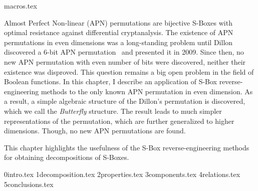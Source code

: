 \myminitoc

{macros.tex}

Almost Perfect Non-linear (APN) permutations are bijective S-Boxes with optimal resistance against differential cryptanalysis. The existence of APN permutations in even dimensions was a long-standing problem until Dillon~\etal{} discovered a 6-bit APN permutation~\cite{DillonAPN,DillonPres} and presented it in 2009. Since then, no new APN permutation with even number of bits were discovered, neither their existence was disproved. This question remains a big open problem in the field of Boolean functions. In this chapter, I describe an application of S-Box reverse-engineering methods to the only known APN permutation in even dimension. As a result, a simple algebraic structure of the Dillon's permutation is discovered, which we call the \emph{Butterfly} structure. The result leads to much simpler representations of the permutation, which are further generalized to higher dimensions. Though, no new APN permutations are found.

This chapter highlights the usefulness of the S-Box reverse-engineering methods for obtaining decompositions of S-Boxes.

{0intro.tex}
{1decomposition.tex}
{2properties.tex}
{3components.tex}
{4relations.tex}
{5conclusions.tex}

